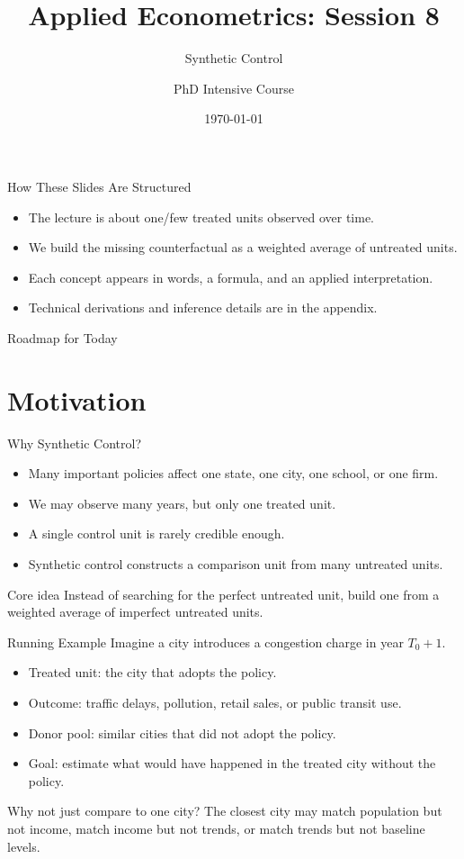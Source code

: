 \documentclass[11pt,aspectratio=169]{beamer}
\title{Applied Econometrics: Session 8}
\subtitle{Synthetic Control}
\author{PhD Intensive Course}
\institute{Lecture 8}
\date{\today}
\begin{document}
\begin{frame}
  \titlepage
\end{frame}

\begin{frame}{How These Slides Are Structured}
  \begin{itemize}
    \item The lecture is about one/few treated units observed over time.
    \item We build the missing counterfactual as a weighted average of untreated units.
    \item Each concept appears in words, a formula, and an applied interpretation.
    \item Technical derivations and inference details are in the appendix.
  \end{itemize}
\end{frame}

\begin{frame}{Roadmap for Today}
  \tableofcontents
\end{frame}

\section{Motivation}

\begin{frame}{Why Synthetic Control?}
  \begin{itemize}
    \item Many important policies affect one state, one city, one school, or one firm.
    \item We may observe many years, but only one treated unit.
    \item A single control unit is rarely credible enough.
    \item Synthetic control constructs a comparison unit from many untreated units.
  \end{itemize}
  \begin{block}{Core idea}
    Instead of searching for the perfect untreated unit, build one from a weighted average of imperfect untreated units.
  \end{block}
\end{frame}

\begin{frame}{Running Example}
  Imagine a city introduces a congestion charge in year \(T_0+1\).
  \begin{itemize}
    \item Treated unit: the city that adopts the policy.
    \item Outcome: traffic delays, pollution, retail sales, or public transit use.
    \item Donor pool: similar cities that did not adopt the policy.
    \item Goal: estimate what would have happened in the treated city without the policy.
  \end{itemize}
  \begin{block}{Why not just compare to one city?}
    The closest city may match population but not income, match income but not trends, or match trends but not baseline levels.
  \end{block}
\end{frame}
\end{document}
